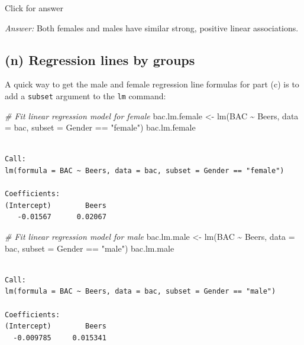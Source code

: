 \documentclass[
]{book}
\newenvironment{Shaded}{\begin{snugshade}}{\end{snugshade}}
\newcommand{\AttributeTok}[1]{\textcolor[rgb]{0.77,0.63,0.00}{#1}}
\newcommand{\CommentTok}[1]{\textcolor[rgb]{0.56,0.35,0.01}{\textit{#1}}}
\newcommand{\FunctionTok}[1]{\textcolor[rgb]{0.00,0.00,0.00}{#1}}
\newcommand{\NormalTok}[1]{#1}
\newcommand{\OtherTok}[1]{\textcolor[rgb]{0.56,0.35,0.01}{#1}}
\newcommand{\SpecialCharTok}[1]{\textcolor[rgb]{0.00,0.00,0.00}{#1}}
\newcommand{\StringTok}[1]{\textcolor[rgb]{0.31,0.60,0.02}{#1}}
\begin{document}
Click for answer

\emph{Answer:} Both females and males have similar strong, positive linear associations.

\hypertarget{n-regression-lines-by-groups}{%
\subsection{(n) Regression lines by groups}\label{n-regression-lines-by-groups}}

A quick way to get the male and female regression line formulas for part (c) is to add a \texttt{subset} argument to the \texttt{lm} command:

\begin{Shaded}
\begin{Highlighting}[]
\CommentTok{\# Fit linear regression model for female}
\NormalTok{bac.lm.female }\OtherTok{\textless{}{-}} \FunctionTok{lm}\NormalTok{(BAC }\SpecialCharTok{\textasciitilde{}}\NormalTok{ Beers, }\AttributeTok{data =}\NormalTok{ bac, }\AttributeTok{subset =}\NormalTok{ Gender }\SpecialCharTok{==} \StringTok{"female"}\NormalTok{)}
\NormalTok{bac.lm.female}
\end{Highlighting}
\end{Shaded}

\begin{verbatim}

Call:
lm(formula = BAC ~ Beers, data = bac, subset = Gender == "female")

Coefficients:
(Intercept)        Beers  
   -0.01567      0.02067  
\end{verbatim}

\begin{Shaded}
\begin{Highlighting}[]
\CommentTok{\# Fit linear regression model for male}
\NormalTok{bac.lm.male }\OtherTok{\textless{}{-}} \FunctionTok{lm}\NormalTok{(BAC }\SpecialCharTok{\textasciitilde{}}\NormalTok{ Beers, }\AttributeTok{data =}\NormalTok{ bac, }\AttributeTok{subset =}\NormalTok{ Gender }\SpecialCharTok{==} \StringTok{"male"}\NormalTok{)}
\NormalTok{bac.lm.male}
\end{Highlighting}
\end{Shaded}

\begin{verbatim}

Call:
lm(formula = BAC ~ Beers, data = bac, subset = Gender == "male")

Coefficients:
(Intercept)        Beers  
  -0.009785     0.015341  
\end{verbatim}
\end{document}
